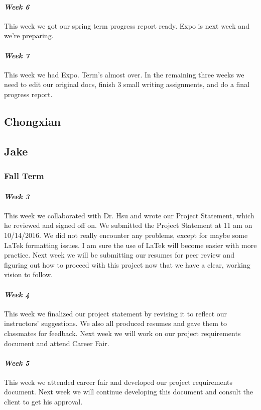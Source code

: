 \documentclass[onecolumn, draftclsnofoot,10pt, compsoc]{IEEEtran}
\begin{document}
\paragraph{\emph{Week 6}}
This week we got our spring term progress report ready. Expo is next week and we're preparing.
\paragraph{\emph{Week 7}}
This week we had Expo. Term's almost over. In the remaining three weeks we need to edit our original docs, finish 3 small writing assignments, and do a final progress report.
\subsection{Chongxian}

\subsection{Jake}
\subsubsection{Fall Term}

\paragraph{\emph{Week 3}}
This week we collaborated with Dr. Hsu and wrote our Project Statement, which he reviewed and signed off on. We submitted the Project Statement at 11 am on 10/14/2016. We did not really encounter any problems, except for maybe some LaTek formatting issues. I am sure the use of LaTek will become easier with more practice. Next week we will be submitting our resumes for peer review and figuring out how to proceed with this project now that we have a clear, working vision to follow.
\paragraph{\emph{Week 4}}
This week we finalized our project statement by revising it to reflect our instructors' suggestions. We also all produced resumes and gave them to classmates for feedback. Next week we will work on our project requirements document and attend Career Fair.

\paragraph{\emph{Week 5}}
This week we attended career fair and developed our project requirements document. Next week we will continue developing this document and consult the client to get his approval.
\end{document}
